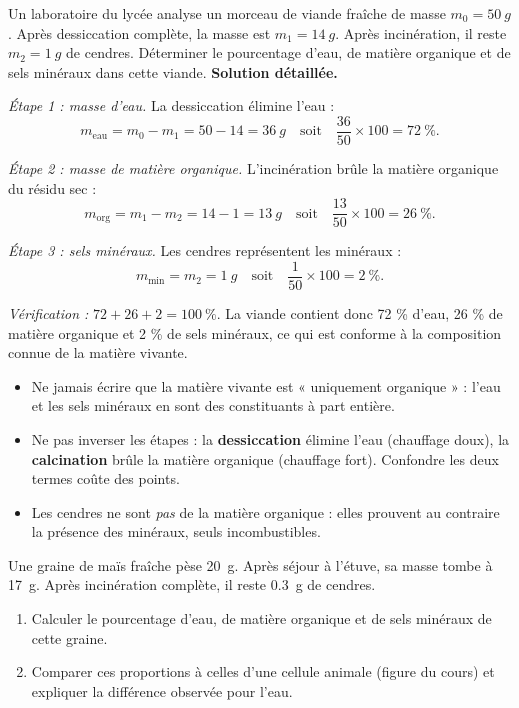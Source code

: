 \documentclass[11pt]{article}
\begin{document}
\begin{exoresolu}
Un laboratoire du lycée analyse un morceau de viande fraîche de masse $m_0 = \SI{50}{g}$. Après dessiccation complète, la masse est $m_1 = \SI{14}{g}$. Après incinération, il reste $m_2 = \SI{1}{g}$ de cendres. Déterminer le pourcentage d'eau, de matière organique et de sels minéraux dans cette viande.
\tcblower
\textbf{Solution détaillée.}

\emph{Étape 1 : masse d'eau.} La dessiccation élimine l'eau :
\[ m_{\text{eau}} = m_0 - m_1 = 50 - 14 = \SI{36}{g} \quad \text{soit} \quad \frac{36}{50}\times 100 = 72\ \%. \]

\emph{Étape 2 : masse de matière organique.} L'incinération brûle la matière organique du résidu sec :
\[ m_{\text{org}} = m_1 - m_2 = 14 - 1 = \SI{13}{g} \quad \text{soit} \quad \frac{13}{50}\times 100 = 26\ \%. \]

\emph{Étape 3 : sels minéraux.} Les cendres représentent les minéraux :
\[ m_{\text{min}} = m_2 = \SI{1}{g} \quad \text{soit} \quad \frac{1}{50}\times 100 = 2\ \%. \]

\emph{Vérification :} $72 + 26 + 2 = 100\ \%$. La viande contient donc 72 \% d'eau, 26 \% de matière organique et 2 \% de sels minéraux, ce qui est conforme à la composition connue de la matière vivante.
\end{exoresolu}

\begin{attention}
\begin{itemize}
\item Ne jamais écrire que la matière vivante est « uniquement organique » : l'eau et les sels minéraux en sont des constituants à part entière.
\item Ne pas inverser les étapes : la \textbf{dessiccation} élimine l'eau (chauffage doux), la \textbf{calcination} brûle la matière organique (chauffage fort). Confondre les deux termes coûte des points.
\item Les cendres ne sont \emph{pas} de la matière organique : elles prouvent au contraire la présence des minéraux, seuls incombustibles.
\end{itemize}
\end{attention}

\begin{exercice}
Une graine de maïs fraîche pèse \SI{20}{g}. Après séjour à l'étuve, sa masse tombe à \SI{17}{g}. Après incinération complète, il reste \SI{0,3}{g} de cendres.
\begin{enumerate}
\item Calculer le pourcentage d'eau, de matière organique et de sels minéraux de cette graine.
\item Comparer ces proportions à celles d'une cellule animale (figure du cours) et expliquer la différence observée pour l'eau.
\end{enumerate}
\end{exercice}
\end{document}
